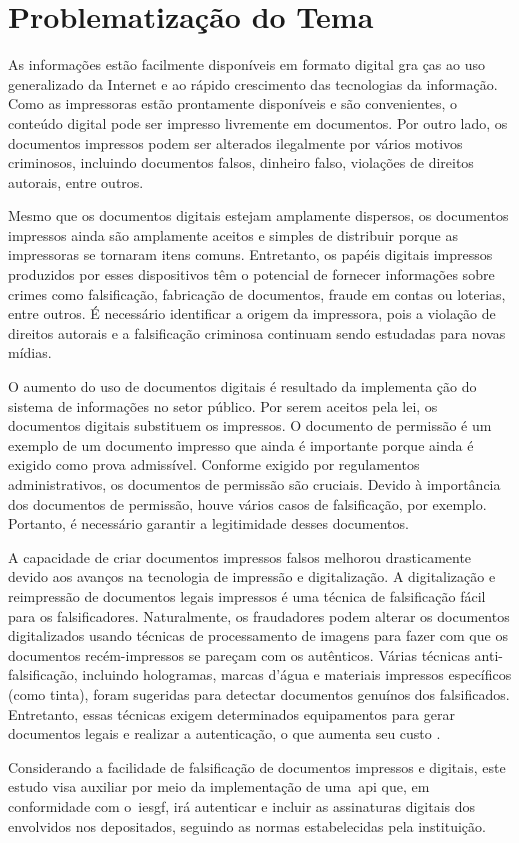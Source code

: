 \section{Problematização do Tema}

As informações estão facilmente disponíveis em formato digital gra
ças ao uso generalizado da Internet e ao rápido crescimento das
tecnologias da informação.
Como as impressoras estão prontamente disponíveis e são
convenientes, o conteúdo digital pode ser
impresso livremente em documentos.
Por outro lado, os documentos impressos podem ser alterados
ilegalmente por vários motivos criminosos, incluindo documentos
falsos, dinheiro falso, violações
de direitos autorais, entre outros\cite{tsai2019}.

Mesmo que os documentos digitais estejam amplamente dispersos, os
documentos impressos ainda são amplamente aceitos e simples de
distribuir porque as impressoras se tornaram itens comuns.
Entretanto, os papéis digitais impressos produzidos por esses
dispositivos têm o potencial de fornecer informações sobre crimes
como falsificação, fabricação de documentos, fraude em contas ou
loterias, entre outros.
É necessário identificar a origem da impressora, pois a violação de
direitos autorais e a falsificação criminosa continuam sendo
estudadas para novas mídias\cite{tsai2019}.

O aumento do uso de documentos digitais é resultado da implementa
ção do sistema de informações no setor público.
Por serem aceitos pela lei, os documentos digitais substituem os
impressos.
O documento de permissão é um exemplo de um documento impresso que
ainda é importante porque ainda é exigido como prova admissível.
Conforme exigido por regulamentos administrativos, os documentos de
permissão são cruciais.
Devido à importância dos documentos de permissão, houve vários
casos de falsificação, por exemplo.
Portanto, é necessário garantir a legitimidade desses documentos\cite{
    arief2019}.

A capacidade de criar documentos impressos falsos melhorou
drasticamente devido aos avanços na tecnologia de impressão e
digitalização.
A digitalização e reimpressão de documentos legais impressos é uma
técnica de falsificação fácil para os falsificadores.
Naturalmente, os fraudadores podem alterar os documentos
digitalizados usando técnicas de processamento de imagens para
fazer com que os documentos recém-impressos se pareçam
com os autênticos.
Várias técnicas anti-falsificação, incluindo hologramas, marcas
d'água e materiais impressos específicos (como tinta), foram
sugeridas para detectar documentos genuínos dos falsificados.
Entretanto, essas técnicas exigem determinados equipamentos para
gerar documentos legais e realizar a autenticação, o que aumenta seu custo
\cite{zhang2019}.

Considerando a facilidade de falsificação de documentos impressos e digitais,
este estudo visa auxiliar por meio da implementação de uma~\acrshort{api} que,
em conformidade com o~\acrlong{iesgf}, irá autenticar e incluir as assinaturas
digitais dos envolvidos nos  depositados, seguindo as normas
estabelecidas pela instituição.